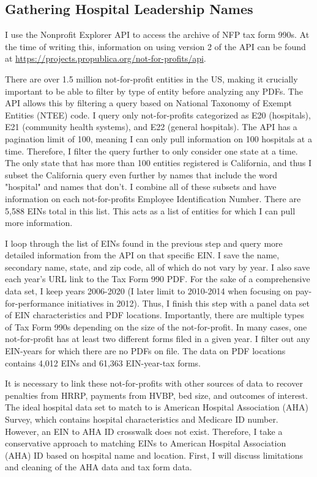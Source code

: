 \documentclass[12pt]{article}
\begin{document}
\subsection{Gathering Hospital Leadership Names}

I use the Nonprofit Explorer API to access the archive of NFP tax form 990s. At the time of writing this, information on using version 2 of the API can be found at \hyperlink{https://projects.propublica.org/not-for-profits/api}{https://projects.propublica.org/not-for-profits/api}. 
    
There are over 1.5 million not-for-profit entities in the US, making it crucially important to be able to filter by type of entity before analyzing any PDFs. The API allows this by filtering a query based on National Taxonomy of Exempt Entities (NTEE) code. I query only not-for-profits categorized as E20 (hospitals), E21 (community health systems), and E22 (general hospitals). The API has a pagination limit of 100, meaning I can only pull information on 100 hospitals at a time. Therefore, I filter the query further to only consider one state at a time. The only state that has more than 100 entities registered is California, and thus I subset the California query even further by names that include the word "hospital" and names that don't. I combine all of these subsets and have information on each not-for-profits Employee Identification Number. There are 5,588 EINs total in this list. This acts as a list of entities for which I can pull more information. 

I loop through the list of EINs found in the previous step and query more detailed information from the API on that specific EIN. I save the name, secondary name, state, and zip code, all of which do not vary by year. I also save each year's URL link to the Tax Form 990 PDF. For the sake of a comprehensive data set, I keep years 2006-2020 (I later limit to 2010-2014 when focusing on pay-for-performance initiatives in 2012). Thus, I finish this step with a panel data set of EIN characteristics and PDF locations. Importantly, there are multiple types of Tax Form 990s depending on the size of the not-for-profit. In many cases, one not-for-profit has at least two different forms filed in a given year. I filter out any EIN-years for which there are no PDFs on file. The data on PDF locations contains 4,012 EINs and 61,363 EIN-year-tax forms.

It is necessary to link these not-for-profits with other sources of data to recover penalties from HRRP, payments from HVBP, bed size, and outcomes of interest. The ideal hospital data set to match to is American Hospital Association (AHA) Survey, which contains hospital characteristics and Medicare ID number. However, an EIN to AHA ID crosswalk does not exist. Therefore, I take a conservative approach to matching EINs to American Hospital Association (AHA) ID based on hospital name and location. First, I will discuss limitations and cleaning of the AHA data and tax form data. 
\end{document}

